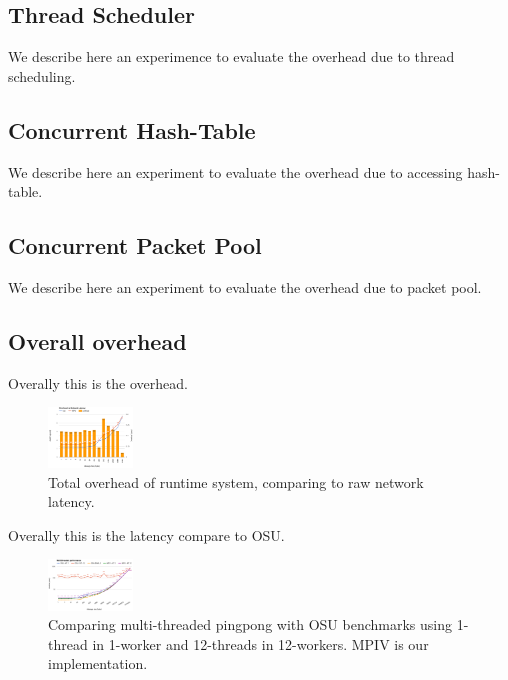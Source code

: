 \subsection{Thread Scheduler}
We describe here an experimence to evaluate the overhead due to thread scheduling.


\subsection{Concurrent Hash-Table}
We describe here an experiment to evaluate the overhead due to accessing hash-table.

\subsection{Concurrent Packet Pool}
We describe here an experiment to evaluate the overhead due to packet pool.


\subsection{Overall overhead}
Overally this is the overhead.
\begin{figure}[h!]
  \centering 
  \includegraphics[width=0.2\textwidth]{fig/overhead.png}
  \caption{Total overhead of runtime system, comparing to raw network latency.}
\end{figure}

Overally this is the latency compare to OSU.
\begin{figure}[h!]
  \centering 
  \includegraphics[width=0.2\textwidth]{fig/pingpong.png}
  \caption{Comparing multi-threaded pingpong with OSU benchmarks using 1-thread
  in 1-worker and 12-threads in 12-workers. MPIV is our implementation.}
\end{figure}

